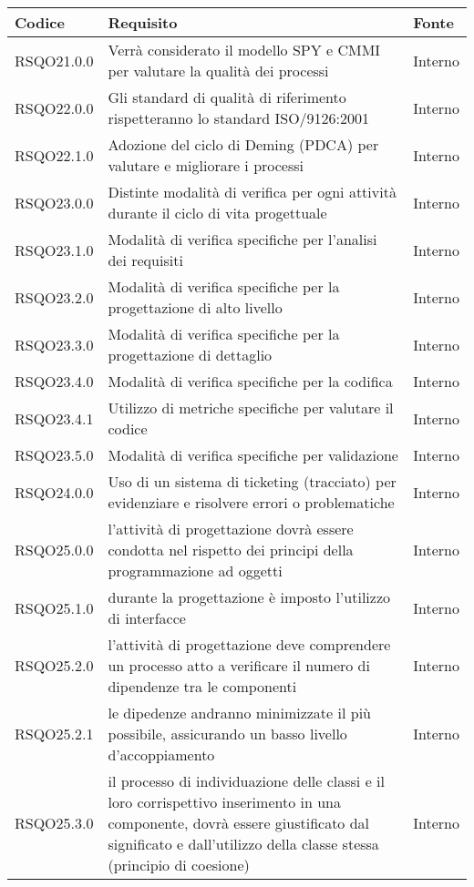 \begin{center}
\begin{longtable}{lp{}l}
\toprule Codice & Requisito & Fonte\\
\midrule
RSQO21.0.0 & Verrà considerato il modello SPY e CMMI per valutare la qualità dei processi & Interno \\
RSQO22.0.0 & Gli standard di qualità di riferimento rispetteranno lo standard ISO/9126:2001 & Interno \\
RSQO22.1.0 & Adozione del ciclo di Deming (PDCA) per valutare e migliorare i processi & Interno \\
RSQO23.0.0 & Distinte modalità di verifica per ogni attività durante il ciclo di vita progettuale & Interno \\
RSQO23.1.0 & Modalità di verifica specifiche per l'analisi dei requisiti & Interno \\
RSQO23.2.0 & Modalità di verifica specifiche per la progettazione di alto livello & Interno \\
RSQO23.3.0 & Modalità di verifica specifiche per la progettazione di dettaglio & Interno \\
RSQO23.4.0 & Modalità di verifica specifiche per la codifica & Interno \\
RSQO23.4.1 & Utilizzo di metriche specifiche per valutare il codice & Interno \\
RSQO23.5.0 & Modalità di verifica specifiche per validazione & Interno \\
RSQO24.0.0 & Uso di un sistema di ticketing (tracciato) per evidenziare e risolvere errori o problematiche & Interno \\
RSQO25.0.0 & l'attività di progettazione dovrà essere condotta nel rispetto dei principi della programmazione ad oggetti & Interno \\
RSQO25.1.0 & durante la progettazione è imposto l'utilizzo di interfacce & Interno \\
RSQO25.2.0 & l'attività di progettazione deve comprendere un processo atto a verificare il numero di dipendenze tra le componenti & Interno \\
RSQO25.2.1 & le dipedenze andranno minimizzate il più possibile, assicurando un basso livello d'accoppiamento & Interno \\
RSQO25.3.0 & il processo di individuazione delle classi e il loro corrispettivo inserimento in una componente, dovrà essere giustificato dal significato e dall'utilizzo della classe stessa (principio di coesione) & Interno \\
\bottomrule
\end{longtable}
\end{center}

